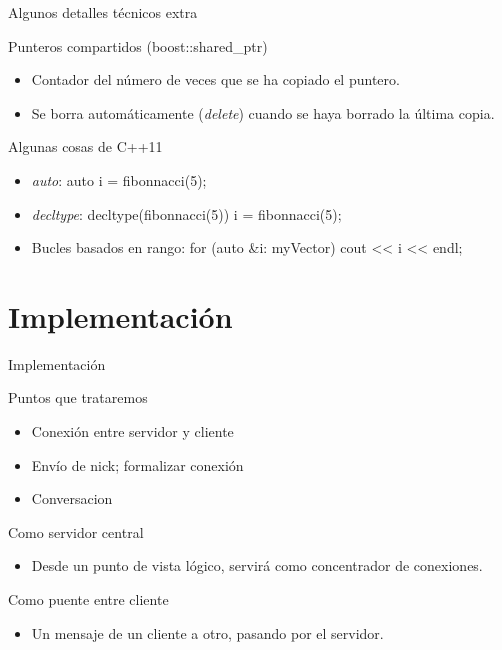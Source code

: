\documentclass[spanish,xcolor=dvipsnames,svgnames]{beamer}
\begin{document}
\begin{frame}{Algunos detalles técnicos extra}

  \begin{block}{Punteros compartidos (boost::shared\_ptr)}
    \begin{itemize}
    \item Contador del número de veces que se ha copiado el puntero.
    \item Se borra automáticamente (\textit{delete}) cuando se haya
      borrado la última copia.
    \end{itemize}
  \end{block}

  \begin{block}{Algunas cosas de C++11}
    \begin{itemize}
    \item \textit{auto}: auto i = fibonnacci(5);
    \item \textit{decltype}: decltype(fibonnacci(5)) i =
      fibonnacci(5);
    \item Bucles basados en rango: for (auto \&i: myVector) cout << i <<
      endl;
    \end{itemize}
  \end{block}

\end{frame}



\section{Implementación}

\begin{frame}{Implementación}
  \begin{block}{Puntos que trataremos}
    \begin{itemize}
    \item Conexión entre servidor y cliente
    \item Envío de nick; formalizar conexión
    \item Conversacion
    \end{itemize}
  \end{block}
  \pause

  \begin{block}{Como servidor central}
    \begin{itemize}
    \item Desde un punto de vista lógico, servirá como concentrador de conexiones.
    \end{itemize}
  \end{block}
  \begin{block}{Como puente entre cliente}
    \begin{itemize}
    \item Un mensaje de un cliente a otro, pasando por el servidor.
    \end{itemize}
  \end{block}
\end{frame}
\end{document}
